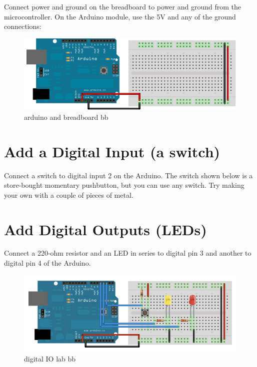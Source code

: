 Connect power and ground on the breadboard to power and ground from the microcontroller. On the Arduino module, use the 5V and any of the ground connections:

\begin{figure}[!htb]
 \centering
 \includegraphics[scale=1]{img/digitalio/arduino_and_breadboard_bb-t.png}
 \caption{arduino and breadboard bb}
 \label{arduino and breadboard bb}
\end{figure}


\section{Add a Digital Input (a switch)}

Connect a switch to digital input 2 on the Arduino. The switch shown below is a store-bought momentary pushbutton, but you can use any switch. Try making your own with a couple of pieces of metal.

\section{Add Digital Outputs (LEDs)}

Connect a 220-ohm resistor and an LED in series to digital pin 3 and another to digital pin 4 of the Arduino.

\begin{figure}[!htb]
 \centering
 \includegraphics[scale=1]{img/digitalio//digital_IO_lab_bb.png}
 \caption{digital IO lab bb}
 \label{digital IO lab bb}
\end{figure}

